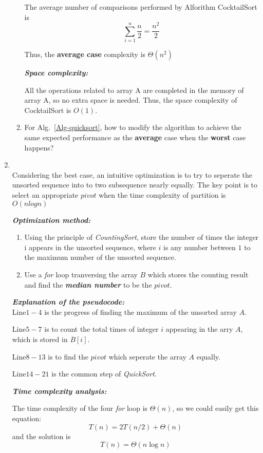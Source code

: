 \documentclass[12pt,a4paper]{article}
\makeatletter
\newtheorem*{solution}{Solution}
\theoremstyle{definition}
\renewenvironment{solution}[1][Solution] {\par\pushQED{\qed}\normalfont\topsep6\p@\@plus6\p@\relax\trivlist\item[\hskip\labelsep\bfseries#1\@addpunct{.}]\ignorespaces}{\popQED\endtrivlist\@endpefalse} \makeatother
\makeatother
\begin{document}
\begin{enumerate}
\begin{enumerate}
The average number of comparisons performed by Alforithm CocktailSort is 
$$\sum_{i=1}^n \frac{n}{2}=\frac{n^2}{2}$$

Thus, the \textbf{average case} complexity is $\Theta(n^2)$

\textbf{\textit{Space complexity:}}

All the operations related to array A are completed in the memory of array A, so no extra space is needed. Thus, the space complexity of CocktailSort is $O(1)$.


\item For Alg.~\ref{Alg-quicksort}, how to modify the algorithm to achieve the same expected performance as the \textbf{average} case when the \textbf{worst} case happens?
\end{enumerate} 
    \begin{solution}
    ~\\
    Considering the best case, an intuitive optimization is to try to seperate the unsorted sequence into to two subsequence nearly equally. The key point is to select an appropriate $pivot$ when the time complexity of partition is $O(nlogn)$

	\textbf{\textit{Optimization method:}}
	\begin{enumerate}
	\item Using the principle of \emph{CountingSort}, store the number of times the integer i appears in the unsorted sequence, where $i$ is any number between $1$ to the maximum number of the unsorted sequence. 
	\item Use a \emph{\textit{for}} loop tranversing the array $B$ which stores the counting result and find the {\large \textbf{\emph{median number}}} to be the $pivot$. 
	\end{enumerate}
	\textbf{\textit{Explanation of the pseudocode:}}~\\
	Line$1-4$ is the progress of finding the maximum of the unsorted array $A$.
	
	Line$5-7$ is to count the total times of integer $i$ appearing in the arry $A$, which is stored in $B[i]$.
	
	Line$8-13$ is to find the $pivot$ which seperate the array $A$ equally.
	
	Line$14-21$ is the common step of \textit{QuickSort}.
	
	\textbf{\textit{Time complexity analysis:}}
	
	The time complexity of the four \emph{\textit{for}} loop is $\Theta(n)$, so we could easily get this equation:
	$$T(n)=2T(n/2)+\Theta(n)$$
	and the solution is
	$$T(n)=\Theta(n\log n)$$
	

\end{solution}
\end{enumerate}
\end{document}
